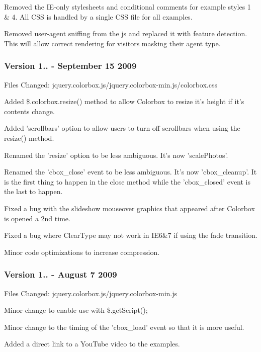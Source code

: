 \begin{DoxyItemize}
\item Removed the I\-E-\/only stylesheets and conditional comments for example styles 1 \& 4. All C\-S\-S is handled by a single C\-S\-S file for all examples.
\item Removed user-\/agent sniffing from the js and replaced it with feature detection. This will allow correct rendering for visitors masking their agent type.
\end{DoxyItemize}

\subsubsection*{Version 1.. -\/ September 15 2009}

Files Changed\-: jquery.\-colorbox.\-js/jquery.colorbox-\/min.\-js/colorbox.css


\begin{DoxyItemize}
\item Added \$.colorbox.\-resize() method to allow Colorbox to resize it's height if it's contents change.
\item Added 'scrollbars' option to allow users to turn off scrollbars when using the resize() method.
\item Renamed the 'resize' option to be less ambiguous. It's now 'scale\-Photos'.
\item Renamed the 'cbox\-\_\-close' event to be less ambiguous. It's now 'cbox\-\_\-cleanup'. It is the first thing to happen in the close method while the 'cbox\-\_\-closed' event is the last to happen.
\item Fixed a bug with the slideshow mouseover graphics that appeared after Colorbox is opened a 2nd time.
\item Fixed a bug where Clear\-Type may not work in I\-E6\&7 if using the fade transition.
\item Minor code optimizations to increase compression.
\end{DoxyItemize}

\subsubsection*{Version 1.. -\/ August 7 2009}

Files Changed\-: jquery.\-colorbox.\-js/jquery.colorbox-\/min.\-js


\begin{DoxyItemize}
\item Minor change to enable use with \$.get\-Script();
\item Minor change to the timing of the 'cbox\-\_\-load' event so that it is more useful.
\item Added a direct link to a You\-Tube video to the examples.
\end{DoxyItemize}

